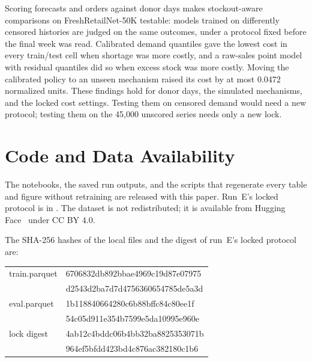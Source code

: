 Scoring forecasts and orders against donor days makes stockout-aware comparisons on FreshRetailNet-50K testable: models trained on differently censored histories are judged on the same outcomes, under a protocol fixed before the final week was read. Calibrated demand quantiles gave the lowest cost in every train/test cell when shortage was more costly, and a raw-sales point model with residual quantiles did so when excess stock was more costly. Moving the calibrated policy to an unseen mechanism raised its cost by at most 0.0472 normalized units. These findings hold for donor days, the simulated mechanisms, and the locked cost settings. Testing them on censored demand would need a new protocol; testing them on the 45,000 unscored series needs only a new lock.

\section*{Code and Data Availability}
\label{sec:availability}

The notebooks, the saved run outputs, and the scripts that regenerate every table and figure without retraining are released with this paper. Run~E's locked protocol is in . The dataset is not redistributed; it is available from Hugging Face~\cite{dingdong2025datasetcard} under CC BY 4.0.

\noindent\begin{minipage}{\columnwidth}
\setlength{\parindent}{1em}\indent The SHA-256 hashes of the local files and the digest of run~E's locked protocol are:
\par\smallskip
{\footnotesize\ttfamily
\begin{tabular}{@{}l@{\quad}l@{}}
train.parquet & 6706832db892bbae4969c19d87e07975\\
              & d2543d2ba7d7d4756360654785de5a3d\\
eval.parquet  & 1b118840664280c6b88bffc84c80ee1f\\
              & 54c05d911e354b7599e5da10995e960e\\
lock digest   & 4ab12c4bddc06b4bb32ba8825353071b\\
              & 964ef5bfdd423bd4c876ac382180c1b6
\end{tabular}}
\end{minipage}
